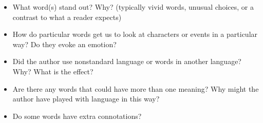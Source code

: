 \documentclass[a4paper,landscape,headrule,footrule,xetex]{foils}
\begin{document}

\begin{itemize}
\item What word(s) stand out? Why? (typically vivid words, unusual choices, or a contrast to what a reader expects)
\item How do particular words get us to look at characters or events in a particular way? Do they evoke an emotion?
\item Did the author use nonstandard language or words in another language? Why? What is the effect?
\item Are there any words that could have more than one meaning? Why might the author have played with language in this way?
\item Do some words have extra connotations?
\end{itemize}

\end{document}
